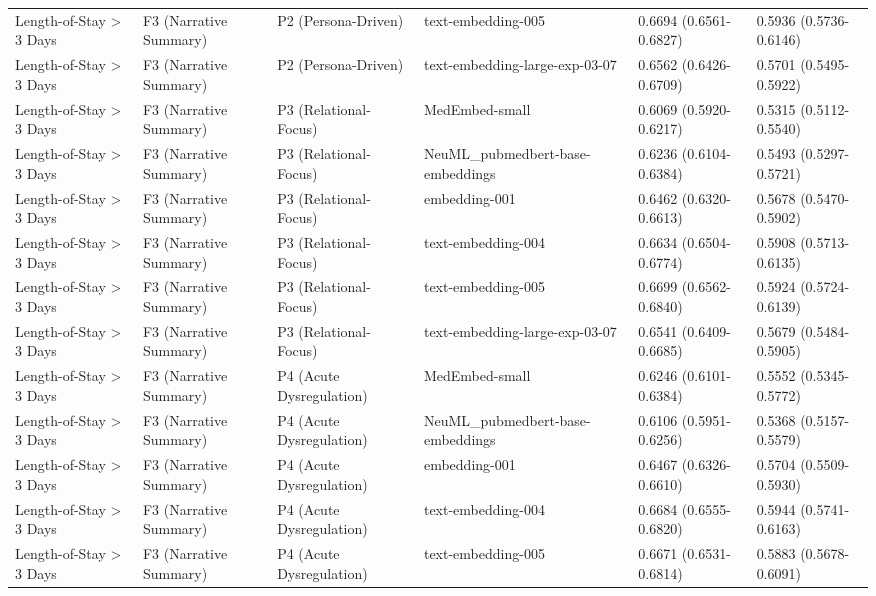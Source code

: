 \begin{tabular}{llllll}
Length-of-Stay \textgreater{} 3 Days & F3 (Narrative Summary) & P2 (Persona-Driven) & text-embedding-005 & 0.6694 (0.6561-0.6827) & 0.5936 (0.5736-0.6146) \\
Length-of-Stay \textgreater{} 3 Days & F3 (Narrative Summary) & P2 (Persona-Driven) & text-embedding-large-exp-03-07 & 0.6562 (0.6426-0.6709) & 0.5701 (0.5495-0.5922) \\
Length-of-Stay \textgreater{} 3 Days & F3 (Narrative Summary) & P3 (Relational-Focus) & MedEmbed-small & 0.6069 (0.5920-0.6217) & 0.5315 (0.5112-0.5540) \\
Length-of-Stay \textgreater{} 3 Days & F3 (Narrative Summary) & P3 (Relational-Focus) & NeuML\_pubmedbert-base-embeddings & 0.6236 (0.6104-0.6384) & 0.5493 (0.5297-0.5721) \\
Length-of-Stay \textgreater{} 3 Days & F3 (Narrative Summary) & P3 (Relational-Focus) & embedding-001 & 0.6462 (0.6320-0.6613) & 0.5678 (0.5470-0.5902) \\
Length-of-Stay \textgreater{} 3 Days & F3 (Narrative Summary) & P3 (Relational-Focus) & text-embedding-004 & 0.6634 (0.6504-0.6774) & 0.5908 (0.5713-0.6135) \\
Length-of-Stay \textgreater{} 3 Days & F3 (Narrative Summary) & P3 (Relational-Focus) & text-embedding-005 & 0.6699 (0.6562-0.6840) & 0.5924 (0.5724-0.6139) \\
Length-of-Stay \textgreater{} 3 Days & F3 (Narrative Summary) & P3 (Relational-Focus) & text-embedding-large-exp-03-07 & 0.6541 (0.6409-0.6685) & 0.5679 (0.5484-0.5905) \\
Length-of-Stay \textgreater{} 3 Days & F3 (Narrative Summary) & P4 (Acute Dysregulation) & MedEmbed-small & 0.6246 (0.6101-0.6384) & 0.5552 (0.5345-0.5772) \\
Length-of-Stay \textgreater{} 3 Days & F3 (Narrative Summary) & P4 (Acute Dysregulation) & NeuML\_pubmedbert-base-embeddings & 0.6106 (0.5951-0.6256) & 0.5368 (0.5157-0.5579) \\
Length-of-Stay \textgreater{} 3 Days & F3 (Narrative Summary) & P4 (Acute Dysregulation) & embedding-001 & 0.6467 (0.6326-0.6610) & 0.5704 (0.5509-0.5930) \\
Length-of-Stay \textgreater{} 3 Days & F3 (Narrative Summary) & P4 (Acute Dysregulation) & text-embedding-004 & 0.6684 (0.6555-0.6820) & 0.5944 (0.5741-0.6163) \\
Length-of-Stay \textgreater{} 3 Days & F3 (Narrative Summary) & P4 (Acute Dysregulation) & text-embedding-005 & 0.6671 (0.6531-0.6814) & 0.5883 (0.5678-0.6091) \\

\end{tabular}
